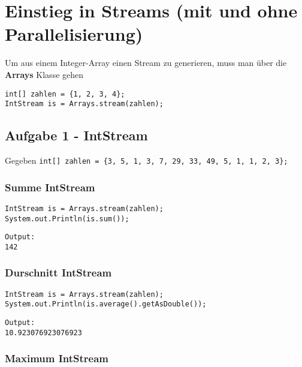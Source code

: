 \section{Einstieg in Streams (mit und ohne
Parallelisierung)}\label{einstieg-in-streams-mit-und-ohne-parallelisierung}

Um aus einem Integer-Array einen Stream zu generieren, muss man über die
\textbf{Arrays} Klasse gehen

\begin{verbatim}
int[] zahlen = {1, 2, 3, 4};
IntStream is = Arrays.stream(zahlen);
\end{verbatim}

\subsection{Aufgabe 1 - IntStream}\label{aufgabe-1---intstream}

Gegeben
\texttt{int{[}{]}\ zahlen\ =\ \{3,\ 5,\ 1,\ 3,\ 7,\ 29,\ 33,\ 49,\ 5,\ 1,\ 1,\ 2,\ 3\};}

\subsubsection{Summe IntStream}\label{summe-intstream}

\begin{verbatim}
IntStream is = Arrays.stream(zahlen);
System.out.Println(is.sum());
\end{verbatim}

\begin{verbatim}
Output:
142
\end{verbatim}

\subsubsection{Durschnitt IntStream}\label{durschnitt-intstream}

\begin{verbatim}
IntStream is = Arrays.stream(zahlen);
System.out.Println(is.average().getAsDouble());
\end{verbatim}

\begin{verbatim}
Output:
10.923076923076923
\end{verbatim}

\subsubsection{Maximum IntStream}\label{maximum-intstream}

